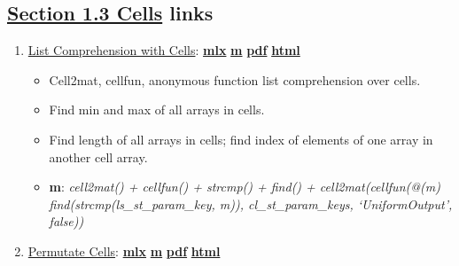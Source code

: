 \documentclass[
]{book}
\providecommand{\tightlist}{%
  \setlength{\itemsep}{0pt}\setlength{\parskip}{0pt}}
\begin{document}
\hypertarget{section-1.3-cellscells-links}{%
\subsection{\texorpdfstring{\protect\hyperlink{cells}{Section 1.3 Cells} links}{Section 1.3 Cells links}}\label{section-1.3-cellscells-links}}

\begin{enumerate}
\def\labelenumi{\arabic{enumi}.}
\tightlist
\item
  \href{https://fanwangecon.github.io/M4Econ/amto/cell/htmlpdfm/fs_cellfuns.html}{List Comprehension with Cells}: \href{https://github.com/FanWangEcon/M4Econ/blob/master/amto/cell/fs_cellfuns.mlx}{\textbf{mlx}} \textbar{} \href{https://github.com/FanWangEcon/M4Econ/blob/master/amto/cell/htmlpdfm/fs_cellfuns.m}{\textbf{m}} \textbar{} \href{https://github.com/FanWangEcon/M4Econ/blob/master/amto/cell/htmlpdfm/fs_cellfuns.pdf}{\textbf{pdf}} \textbar{} \href{https://fanwangecon.github.io/M4Econ/amto/cell/htmlpdfm/fs_cellfuns.html}{\textbf{html}}

  \begin{itemize}
  \tightlist
  \item
    Cell2mat, cellfun, anonymous function list comprehension over cells.
  \item
    Find min and max of all arrays in cells.
  \item
    Find length of all arrays in cells; find index of elements of one array in another cell array.
  \item
    \textbf{m}: \emph{cell2mat() + cellfun() + strcmp() + find() + cell2mat(cellfun(@(m) find(strcmp(ls\_st\_param\_key, m)), cl\_st\_param\_keys, `UniformOutput', false))}
  \end{itemize}
\item
  \href{https://fanwangecon.github.io/M4Econ/amto/cell/htmlpdfm/fs_cellscombinations.html}{Permutate Cells}: \href{https://github.com/FanWangEcon/M4Econ/blob/master/amto/cell/fs_cellscombinations.mlx}{\textbf{mlx}} \textbar{} \href{https://github.com/FanWangEcon/M4Econ/blob/master/amto/cell/htmlpdfm/fs_cellscombinations.m}{\textbf{m}} \textbar{} \href{https://github.com/FanWangEcon/M4Econ/blob/master/amto/cell/htmlpdfm/fs_cellscombinations.pdf}{\textbf{pdf}} \textbar{} \href{https://fanwangecon.github.io/M4Econ/amto/cell/htmlpdfm/fs_cellscombinations.html}{\textbf{html}}


\end{enumerate}
\end{document}
